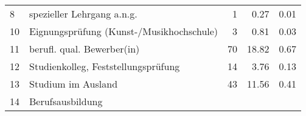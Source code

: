 \begin{longtable}{lXrrr}
     8 &
     \multicolumn{1}{X}{ spezieller Lehrgang a.n.g.   } &


       \num{1} &
       \num[round-mode=places,round-precision=2]{0,27} &
         \num[round-mode=places,round-precision=2]{0,01} \\

     10 &
     \multicolumn{1}{X}{ Eignungsprüfung (Kunst-/Musikhochschule)   } &


       \num{3} &
       \num[round-mode=places,round-precision=2]{0,81} &
         \num[round-mode=places,round-precision=2]{0,03} \\

     11 &
     \multicolumn{1}{X}{ berufl. qual. Bewerber(in)   } &


       \num{70} &
       \num[round-mode=places,round-precision=2]{18,82} &
         \num[round-mode=places,round-precision=2]{0,67} \\

     12 &
     \multicolumn{1}{X}{ Studienkolleg, Feststellungsprüfung   } &


       \num{14} &
       \num[round-mode=places,round-precision=2]{3,76} &
         \num[round-mode=places,round-precision=2]{0,13} \\

     13 &
     \multicolumn{1}{X}{ Studium im Ausland   } &


       \num{43} &
       \num[round-mode=places,round-precision=2]{11,56} &
         \num[round-mode=places,round-precision=2]{0,41} \\

     14 &
     \multicolumn{1}{X}{ Berufsausbildung   } &



\end{longtable}
